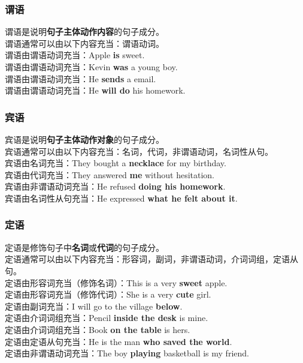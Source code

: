 \documentclass[UTF8]{ctexart}
\begin{document}
\subsubsection{谓语}
    谓语是说明\textbf{句子主体动作内容}的句子成分。\\[3mm]
    谓语通常可以由以下内容充当：谓语动词。\\[6mm]
    谓语由谓语动词充当：Apple \textbf{is} sweet.\\[3mm]
    谓语由谓语动词充当：Kevin \textbf{was} a young boy.\\[3mm]
    谓语由谓语动词充当：He \textbf{sends} a email.\\[3mm]
    谓语由谓语动词充当：He \textbf{will do} his homework.\\

\subsubsection{宾语}
    宾语是说明\textbf{句子主体动作对象}的句子成分。\\[3mm]
    宾语通常可以由以下内容充当：名词，代词，非谓语动词，名词性从句。\\[6mm]
    宾语由名词充当：They bought a \textbf{necklace} for my birthday.\\[3mm]
    宾语由代词充当：They answered \textbf{me} without hesitation.\\[3mm]
    宾语由非谓语动词充当：He refused \textbf{doing his homework}.\\[3mm]
    宾语由名词性从句充当：He expressed \textbf{what he felt about it}.

\newpage
    
\subsubsection{定语}
    定语是修饰句子中\textbf{名词}或\textbf{代词}的句子成分。\\[3mm]
    定语通常可以由以下内容充当：形容词，副词，非谓语动词，介词词组，定语从句。\\[6mm]
    定语由形容词充当（修饰名词）：This is a very \textbf{sweet} apple.\\[3mm]
    定语由形容词充当（修饰代词）：She is a very \textbf{cute} girl.\\[3mm]
    定语由副词充当：I will go to the village \textbf{below}.\\[3mm]
    定语由介词词组充当：Pencil \textbf{inside the desk} is mine.\\[3mm]
    定语由介词词组充当：Book \textbf{on the table} is hers.\\[3mm]
    定语由定语从句充当：He is the man \textbf{who saved the world}.\\[3mm]
    定语由非谓语动词充当：The boy \textbf{playing} basketball is my friend.\\
\end{document}
